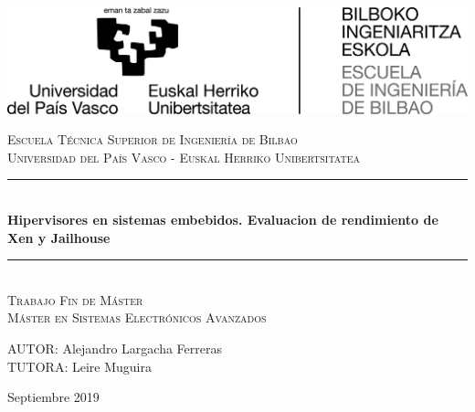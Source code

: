 \begin{titlepage}

\newcommand{\HRule}{\rule{\linewidth}{0.5mm}} %

\center %

\begin{flushright}
\includegraphics[scale=0.35]{recursos/Escuela_Ingenieria_Bizkaia_bilingue_positivo_alta.jpg}
\\[3cm]
\end{flushright}

\textsc{\Large Escuela Técnica Superior de Ingeniería de Bilbao}\\[0.5cm]
\textsc{\large Universidad del País Vasco - Euskal Herriko Unibertsitatea}
\\[2cm]


 \HRule \\[0.4cm]
{ \huge \bfseries Hipervisores en sistemas embebidos. Evaluacion de rendimiento de Xen y Jailhouse }\\[0.4cm] %
\HRule \\[2.0cm]

\textsc{\LARGE Trabajo Fin de Máster}\\[0.5cm]
\textsc{\Large Máster en Sistemas Electrónicos Avanzados }\\[2.0cm]

\begin{flushright}
\large
AUTOR: Alejandro Largacha Ferreras\\ %
TUTORA: Leire Muguira %
\end{flushright}

\vspace{1.1cm}

{ { Septiembre 2019}}\\[3cm] %

\vfill %

\end{titlepage}
